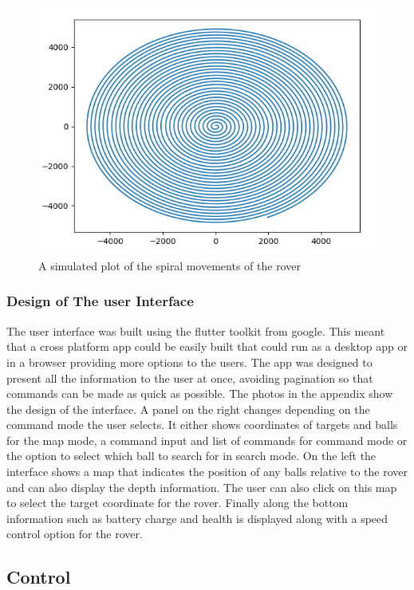 \documentclass[10pt,twoside]{article}
\begin{document}
\begin{figure}[hbt]
    \centering
    \includegraphics[scale = 0.4]{CommandSpiralView.png}
    \caption{A simulated plot of the spiral movements of the rover}
    \label{fig:CommandSpiralView}
\end{figure}

\subsubsection{Design of The user Interface}
The user interface was built using the flutter toolkit from google. This meant that a cross platform app could be easily built that could run as a desktop app or in a browser providing more options to the users. The app was designed to present all the information to the user at once, avoiding pagination so that commands can be made as quick as possible. The photos in the appendix show the design of the interface. A panel on the right changes depending on the command mode the user selects. It either shows coordinates of targets and balls for the map mode, a command input and list of commands for command mode or the option to select which ball to search for in search mode. On the left the interface shows a map that indicates the position of any balls relative to the rover and can also display the depth information. The user can also click on this map to select the target coordinate for the rover. Finally along the bottom information such as battery charge and health is displayed along with a speed control option for the rover.




\subsection{Control}
\end{document}
